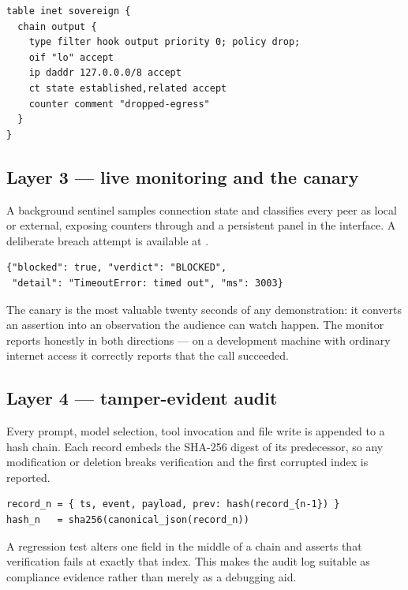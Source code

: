 \begin{lstlisting}
table inet sovereign {
  chain output {
    type filter hook output priority 0; policy drop;
    oif "lo" accept
    ip daddr 127.0.0.0/8 accept
    ct state established,related accept
    counter comment "dropped-egress"
  }
}
\end{lstlisting}

\subsection{Layer 3 --- live monitoring and the canary}

A background sentinel samples connection state and classifies every peer as
local or external, exposing counters through  and a
persistent panel in the interface. A deliberate breach attempt is available at
.

\begin{lstlisting}
{"blocked": true, "verdict": "BLOCKED",
 "detail": "TimeoutError: timed out", "ms": 3003}
\end{lstlisting}

\noindent The canary is the most valuable twenty seconds of any demonstration:
it converts an assertion into an observation the audience can watch happen. The
monitor reports honestly in both directions --- on a development machine with
ordinary internet access it correctly reports that the call succeeded.

\subsection{Layer 4 --- tamper-evident audit}

Every prompt, model selection, tool invocation and file write is appended to a
hash chain. Each record embeds the SHA-256 digest of its predecessor, so any
modification or deletion breaks verification and the first corrupted index is
reported.

\begin{lstlisting}
record_n = { ts, event, payload, prev: hash(record_{n-1}) }
hash_n   = sha256(canonical_json(record_n))
\end{lstlisting}

\noindent A regression test alters one field in the middle of a chain and
asserts that verification fails at exactly that index. This makes the audit
log suitable as compliance evidence rather than merely as a debugging aid.

